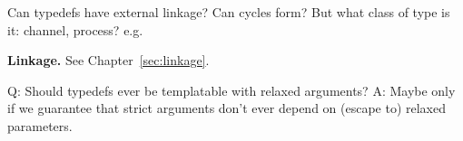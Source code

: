 Can typedefs have external linkage?  Can cycles form?
But what class of type is it: channel, process?
e.g. 



\medskip
\textbf{Linkage.}  See Chapter~\ref{sec:linkage}.  

Q: Should typedefs ever be templatable with relaxed arguments?
A: Maybe only if we guarantee that strict arguments don't
	ever depend on (escape to) relaxed parameters.  



